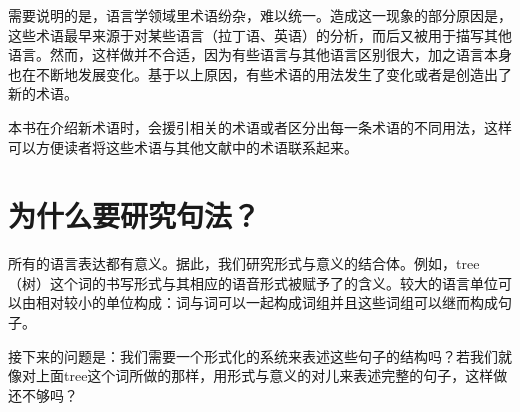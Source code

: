 需要说明的是，语言学领域里术语纷杂，难以统一。造成这一现象的部分原因是，这些术语最早来源于对某些语言（\egc 拉丁语、英语）的分析，而后又被用于描写其他语言。然而，这样做并不合适，因为有些语言与其他语言区别很大，加之语言本身也在不断地发展变化。基于以上原因，有些术语的用法发生了变化或者是创造出了新的术语。

本书在介绍新术语时，会援引相关的术语或者区分出每一条术语的不同用法，这样可以方便读者将这些术语与其他文献中的术语联系起来。

\section{为什么要研究句法？}
\label{sec-wozu-syntax}

所有的语言表达都有意义。据此，我们研究形式与意义的结合体\citep{Saussure16a}\nocite{Saussure16a-Fr}。例如，tree（树）这个词的书写形式与其相应的语音形式被赋予了的含义。较大的语言单位可以由相对较小的单位构成：词与词可以一起构成词组并且这些词组可以继而构成句子。

接下来的问题是：我们需要一个形式化的系统来表述这些句子的结构吗？若我们就像对上面tree这个词所做的那样，用形式与意义的对儿来表述完整的句子，这样做还不够吗？


